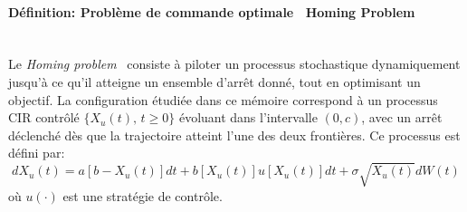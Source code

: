 \paragraph{Définition: Problème de commande optimale \textemdash~Homing Problem}\label{definition_optimal_control}\mbox{}\\
Le \textit{Homing problem}~\cite{whittle1982} consiste à piloter un processus stochastique dynamiquement jusqu'à ce qu'il atteigne un ensemble d'arrêt donné, tout en optimisant un objectif. La configuration étudiée dans ce mémoire correspond à un processus \acs{CIR} contrôlé \( \{X_u(t),\, t \geq 0\} \) évoluant dans l'intervalle \( (0, c) \), avec un arrêt déclenché dès que la trajectoire atteint l'une des deux frontières. Ce processus est défini par:
\begin{equation}\label{controlled_process}
    dX_u(t) = a[b - X_u(t)]dt + b[X_u(t)]u[X_u(t)]dt + \sigma \sqrt{X_u(t)} dW(t)
\end{equation}
où \( u(\cdot) \) est une stratégie de contrôle.

